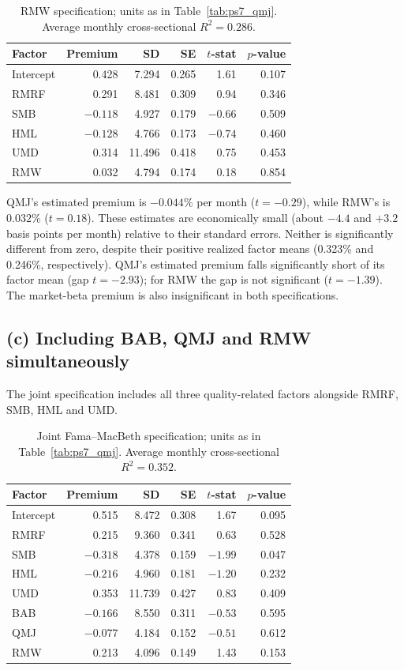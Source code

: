 \begin{table}[H]
\centering
\caption{RMW specification; units as in Table~\ref{tab:ps7_qmj}. Average monthly cross-sectional $R^2=0.286$.}
\label{tab:ps7_rmw}
\begin{tabular}{lrrrrr}
\toprule
Factor & Premium & SD & SE & $t$-stat & $p$-value \\
\midrule
Intercept & 0.428 & 7.294 & 0.265 & 1.61 & 0.107 \\
RMRF & 0.291 & 8.481 & 0.309 & 0.94 & 0.346 \\
SMB & $-0.118$ & 4.927 & 0.179 & $-0.66$ & 0.509 \\
HML & $-0.128$ & 4.766 & 0.173 & $-0.74$ & 0.460 \\
UMD & 0.314 & 11.496 & 0.418 & 0.75 & 0.453 \\
RMW & 0.032 & 4.794 & 0.174 & 0.18 & 0.854 \\
\bottomrule
\end{tabular}
\end{table}

\noindent QMJ's estimated premium is $-0.044\%$ per month ($t=-0.29$), while RMW's
is $0.032\%$ ($t=0.18$). These estimates are economically small (about
$-4.4$ and $+3.2$ basis points per month) relative to their standard errors.
Neither is significantly different from zero, despite their positive realized
factor means (0.323\% and 0.246\%, respectively). QMJ's estimated premium
falls significantly short of its factor mean (gap $t=-2.93$); for RMW the gap
is not significant ($t=-1.39$). The market-beta premium is also insignificant
in both specifications.

\subsection*{(c) Including BAB, QMJ and RMW simultaneously}
The joint specification includes all three quality-related factors alongside
RMRF, SMB, HML and UMD.

\begin{table}[H]
\centering
\caption{Joint Fama--MacBeth specification; units as in Table~\ref{tab:ps7_qmj}. Average monthly cross-sectional $R^2=0.352$.}
\label{tab:ps7_joint}
\begin{tabular}{lrrrrr}
\toprule
Factor & Premium & SD & SE & $t$-stat & $p$-value \\
\midrule
Intercept & 0.515 & 8.472 & 0.308 & 1.67 & 0.095 \\
RMRF & 0.215 & 9.360 & 0.341 & 0.63 & 0.528 \\
SMB & $-0.318$ & 4.378 & 0.159 & $-1.99$ & 0.047 \\
HML & $-0.216$ & 4.960 & 0.181 & $-1.20$ & 0.232 \\
UMD & 0.353 & 11.739 & 0.427 & 0.83 & 0.409 \\
BAB & $-0.166$ & 8.550 & 0.311 & $-0.53$ & 0.595 \\
QMJ & $-0.077$ & 4.184 & 0.152 & $-0.51$ & 0.612 \\
RMW & 0.213 & 4.096 & 0.149 & 1.43 & 0.153 \\
\bottomrule
\end{tabular}
\end{table}

